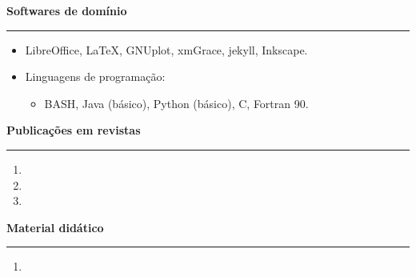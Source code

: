 \documentclass[
   12pt,                         %
   a4paper,                      %
   spanish,                      %
   brazil,                       %
   xcolor=table                  %
]{abntex2}
\newcommand{\customtitle}[1]{\noindent\textbf{\large#1}\vspace{2pt}\hrule}
\begin{document}
\customtitle{Softwares de domínio}

   \begin{itemize}[nosep]
      \item[ ] LibreOffice, \LaTeX, GNUplot, xmGrace, jekyll, Inkscape.

      \item[ ] Linguagens de programação:
      \begin{itemize}[nosep]
         \item[ ] BASH, Java (básico), Python (básico), C, Fortran 90.
      \end{itemize}
   \end{itemize}

\customtitle{Publicações em revistas}

   \begin{enumerate}[nosep]
      \item {}
      \item {}
      \item {}
   \end{enumerate}

\customtitle{Material didático}  

   \begin{enumerate}[nosep]
      \item {}
   \end{enumerate}
\end{document}
